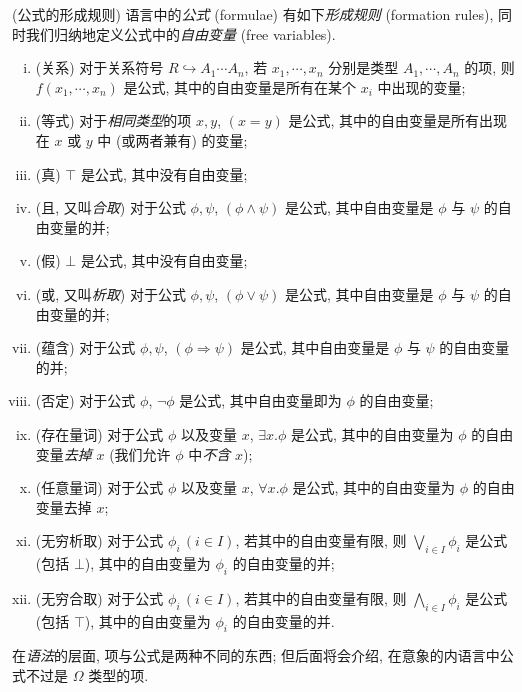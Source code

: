 \begin{definition}
	[label={formula}]
	{(公式的形成规则)}
	语言中的\emph{公式} (formulae) 有如下\emph{形成规则} (formation rules), 同时我们归纳地定义公式中的\emph{自由变量} (free variables).
	\begin{enumerate}[(i)]
		\item (关系) 对于关系符号 $R \hookrightarrow A_1\cdots A_n$, 若 $x_1,\cdots,x_n$ 分别是类型 $A_1,\cdots,A_n$ 的项, 则 $f(x_1,\cdots,x_n)$ 是公式, 其中的自由变量是所有在某个 $x_i$ 中出现的变量;
		\item (等式) 对于\emph{相同类型}的项 $x,y$, $(x=y)$ 是公式, 其中的自由变量是所有出现在 $x$ 或 $y$ 中 (或两者兼有) 的变量;
		\item (真) $\top$ 是公式, 其中没有自由变量;
		\item (且, 又叫\emph{合取}) 对于公式 $\phi,\psi$, $(\phi\wedge\psi)$ 是公式, 其中自由变量是 $\phi$ 与 $\psi$ 的自由变量的并;
		\item (假) $\bot$ 是公式, 其中没有自由变量;
		\item (或, 又叫\emph{析取}) 对于公式 $\phi,\psi$, $(\phi\vee\psi)$ 是公式, 其中自由变量是 $\phi$ 与 $\psi$ 的自由变量的并;
		\item (蕴含) 对于公式 $\phi,\psi$, $(\phi\Rightarrow \psi)$ 是公式, 其中自由变量是 $\phi$ 与 $\psi$ 的自由变量的并;
		\item (否定) 对于公式 $\phi$, $\neg\phi$ 是公式, 其中自由变量即为 $\phi$ 的自由变量;
		\item (存在量词) 对于公式 $\phi$ 以及变量 $x$, $\exists x.\phi$ 是公式, 其中的自由变量为 $\phi$ 的自由变量\emph{去掉} $x$ (我们允许 $\phi$ 中\emph{不含} $x$);
		\item (任意量词) 对于公式 $\phi$ 以及变量 $x$, $\forall x.\phi$ 是公式, 其中的自由变量为 $\phi$ 的自由变量去掉 $x$;
		\item (无穷析取) 对于公式 $\phi_i\, (i\in I)$, 若其中的自由变量有限, 则 $\bigvee_{i\in I}\phi_i$ 是公式 (包括 $\bot$), 其中的自由变量为 $\phi_i$ 的自由变量的并;
		\item (无穷合取) 对于公式 $\phi_i\, (i\in I)$, 若其中的自由变量有限, 则 $\bigwedge_{i\in I}\phi_i$ 是公式 (包括 $\top$), 其中的自由变量为 $\phi_i$ 的自由变量的并.
	\end{enumerate}
\end{definition}

\begin{remark}
	{}
	在\emph{语法}的层面, 项与公式是两种不同的东西; 但后面将会介绍, 在意象的内语言中公式不过是 $\Omega$ 类型的项.
\end{remark}



